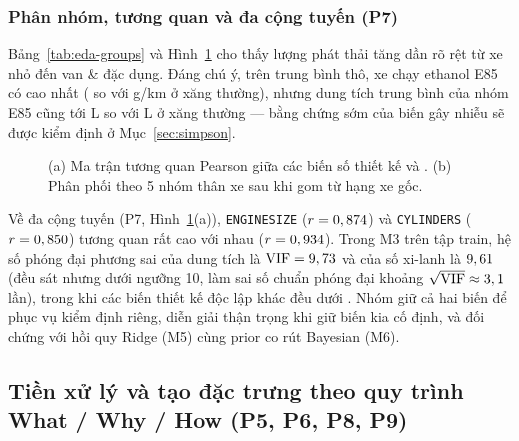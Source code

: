 \subsubsection{Phân nhóm, tương quan và đa cộng tuyến (P7)}
Bảng~\ref{tab:eda-groups} và Hình~\ref{fig:corr-body} cho thấy lượng phát thải tăng dần rõ rệt từ xe nhỏ đến van \& đặc dụng. Đáng chú ý, trên trung bình thô, xe chạy ethanol E85 có \COtwo{} cao nhất (\meanE{} so với \meanX{} g/km ở xăng thường), nhưng dung tích trung bình của nhóm E85 cũng tới \engE{} L so với \engX{} L ở xăng thường --- bằng chứng sớm của biến gây nhiễu sẽ được kiểm định ở Mục~\ref{sec:simpson}.

\begin{table}[htbp]
  \centering
  \caption{Phát thải \COtwo{} trung bình và dung tích động cơ trung bình theo nhiên liệu, thân xe và hệ truyền động.}
  \label{tab:eda-groups}
  \small
  
\end{table}

\begin{figure}[htbp]
  \centering
  
  \caption{(a) Ma trận tương quan Pearson giữa các biến số thiết kế và \COtwo{}. (b) Phân phối \COtwo{} theo 5 nhóm thân xe sau khi gom từ \nVehicleClasses{} hạng xe gốc.}
  \label{fig:corr-body}
\end{figure}

Về đa cộng tuyến (P7, Hình~\ref{fig:corr-body}(a)), \texttt{ENGINESIZE} ($r = 0,874$) và \texttt{CYLINDERS} ($r = 0,850$) tương quan rất cao với nhau ($r = 0,934$). Trong M3 trên tập train, hệ số phóng đại phương sai của dung tích là $\mathrm{VIF} = 9,73$ và của số xi-lanh là $9,61$ (đều sát nhưng dưới ngưỡng 10, làm sai số chuẩn phóng đại khoảng $\sqrt{\mathrm{VIF}} \approx 3,1$ lần), trong khi các biến thiết kế độc lập khác đều dưới \vifMaxOther. Nhóm giữ cả hai biến để phục vụ kiểm định riêng, diễn giải thận trọng khi giữ biến kia cố định, và đối chứng với hồi quy Ridge (M5) cùng prior co rút Bayesian (M6).

\subsection{Tiền xử lý và tạo đặc trưng theo quy trình What / Why / How (P5, P6, P8, P9)}

